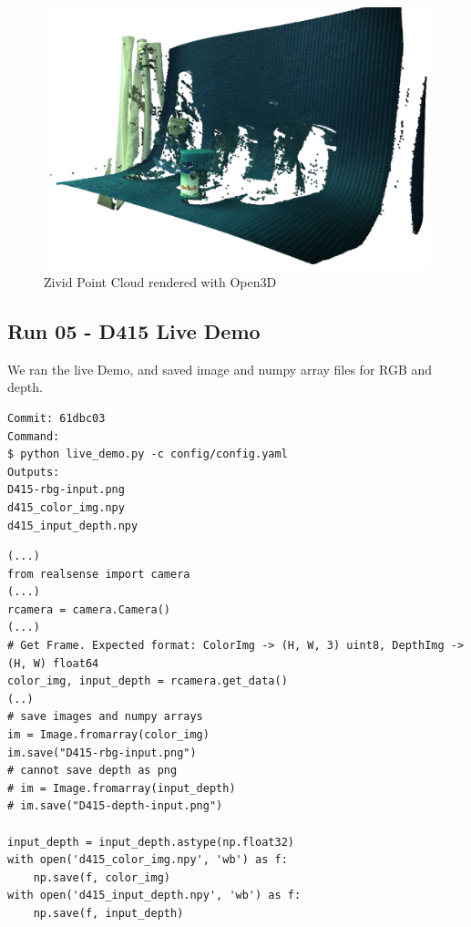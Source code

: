 \begin{figure}[h!]
\centering
\includegraphics[width=\textwidth]{Figures/ZividOpen3DPointCloud.png}
\caption{Zivid Point Cloud rendered with Open3D}
\label{fig:ZividOpen3DPointCloud}
\end{figure}



\subsection{Run 05 - D415 Live Demo}
We ran the live Demo, and saved image and numpy array files for RGB and depth.
\label{app_res:05}
\begin{verbatim}
Commit: 61dbc03
Command:
$ python live_demo.py -c config/config.yaml
Outputs:
D415-rbg-input.png
d415_color_img.npy
d415_input_depth.npy
\end{verbatim}

\begin{verbatim}
(...)
from realsense import camera    
(...)
rcamera = camera.Camera()
(...)
# Get Frame. Expected format: ColorImg -> (H, W, 3) uint8, DepthImg -> (H, W) float64
color_img, input_depth = rcamera.get_data()
(..)
# save images and numpy arrays
im = Image.fromarray(color_img)
im.save("D415-rbg-input.png")
# cannot save depth as png
# im = Image.fromarray(input_depth)
# im.save("D415-depth-input.png")

input_depth = input_depth.astype(np.float32)
with open('d415_color_img.npy', 'wb') as f:
    np.save(f, color_img)
with open('d415_input_depth.npy', 'wb') as f:
    np.save(f, input_depth)

\end{verbatim}

